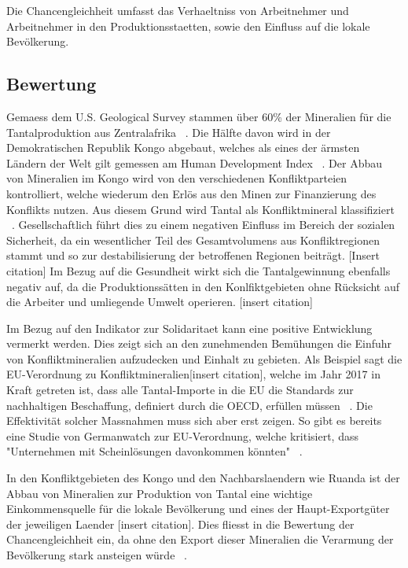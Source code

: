 Die Chancengleichheit umfasst das Verhaeltniss von Arbeitnehmer und
Arbeitnehmer in den Produktionsstaetten, sowie den Einfluss auf die lokale
Bevölkerung.

\subsection{Bewertung}

Gemaess dem U.S. Geological Survey stammen über 60\% der Mineralien für die
Tantalproduktion aus Zentralafrika ~\cite{USGSMine8}. Die H\"alfte davon
wird in der Demokratischen Republik Kongo abgebaut, welches als eines der \"armsten
L\"andern der Welt gilt gemessen am Human Development Index ~\cite{UNDProgramme2018}. Der Abbau von Mineralien im
Kongo wird von den verschiedenen Konfliktparteien kontrolliert, welche wiederum
den Erlös aus den Minen zur Finanzierung des Konflikts nutzen. Aus diesem Grund
wird Tantal als Konfliktmineral klassifiziert ~\cite{doevenspeck2012konfliktmineralien}.
Gesellschaftlich führt dies zu einem negativen Einfluss im Bereich der sozialen
Sicherheit, da ein wesentlicher Teil des Gesamtvolumens aus Konfliktregionen
stammt und so zur destabilisierung der betroffenen Regionen beitr\"agt. [Insert citation]
Im Bezug auf die Gesundheit wirkt sich die Tantalgewinnung ebenfalls negativ auf, da die 
Produktionss\"atten in den Konlfiktgebieten ohne Rücksicht auf die Arbeiter und umliegende Umwelt
operieren. [insert citation]

Im Bezug auf den Indikator zur Solidaritaet kann eine positive Entwicklung vermerkt werden.
Dies zeigt sich an den zunehmenden Bemühungen die Einfuhr von Konfliktmineralien 
aufzudecken und Einhalt zu gebieten. Als Beispiel sagt die EU-Verordnung zu Konfliktmineralien[insert citation], welche im Jahr 2017 in Kraft getreten ist, dass alle Tantal-Importe in die EU die Standards zur nachhaltigen Beschaffung, definiert durch die OECD, erfüllen müssen 
~\cite{europeancommission}. Die Effektivit\"at solcher Massnahmen muss sich aber erst zeigen. 
So gibt es bereits eine Studie von Germanwatch zur EU-Verordnung, welche kritisiert, dass 
"Unternehmen mit Scheinlösungen davonkommen könnten" ~\cite{Governan35}.

In den Konfliktgebieten des Kongo und den Nachbarslaendern wie Ruanda ist der Abbau von 
Mineralien zur Produktion von Tantal eine wichtige Einkommensquelle für die lokale Bevölkerung
und eines der Haupt-Exportgüter der jeweiligen Laender [insert citation]. Dies fliesst in
die Bewertung der Chancengleichheit ein, da ohne den Export dieser Mineralien die Verarmung
der Bevölkerung stark ansteigen würde ~\cite{DRCongo35}.


